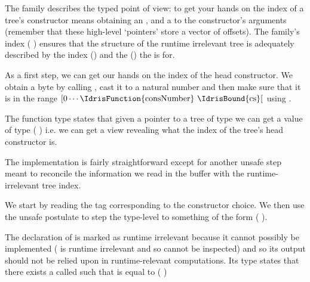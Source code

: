 The  family describes the typed point of view:
to get your hands on the index of a tree's constructor means
obtaining an ,
and a  to the constructor's arguments
(remember that these high-level `pointers' store a vector of offsets).
%
The family's index ( \IdrisData{\#} )
ensures that the structure of the runtime irrelevant
tree is adequately described by
the index () and
the  () the  is for.


As a first step, we can get our hands on the index of the head constructor.
We obtain a byte by calling , cast it to a
natural number and then make sure that it is in the range
$[0 \cdots \text{\IdrisFunction{consNumber} \IdrisBound{cs}}[$ using
.


The  function type states that given a pointer
to a tree  of type  we can get a value
of type (  )
%
i.e. we can get a view revealing what the
index of the tree's head constructor is.


The implementation is fairly straightforward except for another
unsafe step meant to reconcile the information we read in the buffer
with the runtime-irrelevant tree index.


We start by reading the tag 
corresponding to the constructor choice.
%
We then use the unsafe  postulate to step the
type-level  to something of the form
( \IdrisData{\#} ).


The declaration of  is marked as runtime
irrelevant because it cannot possibly be implemented
( is runtime irrelevant and so cannot be inspected)
and so its output should not be relied upon in runtime-relevant
computations.
%
Its type states that there exists a  called
 such that  is equal to
( \IdrisData{\#} )

